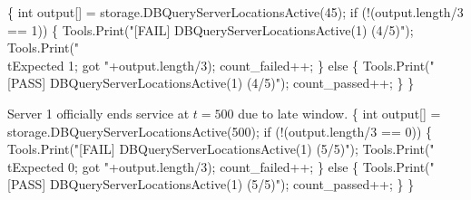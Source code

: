 \documentclass{article}
\def\nwendcode{\endtrivlist \endgroup}
\let\nwdocspar=\par
\begin{document}
\{
  int output[] = storage.DBQueryServerLocationsActive(45);
  if (!(output.length/3 == 1)) \{
    Tools.Print("[FAIL] DBQueryServerLocationsActive(1) (4/5)");
    Tools.Print("\\tExpected 1; got "+output.length/3);
    count_failed++;
  \} else \{
    Tools.Print("[PASS] DBQueryServerLocationsActive(1) (4/5)");
    count_passed++;
  \}
\}
\nwendcode{}\nwdocspar
Server 1 officially ends service at $t=500$ due to late window.
\nwenddocs{}\endmoddef{}
\{
  int output[] = storage.DBQueryServerLocationsActive(500);
  if (!(output.length/3 == 0)) \{
    Tools.Print("[FAIL] DBQueryServerLocationsActive(1) (5/5)");
    Tools.Print("\\tExpected 0; got "+output.length/3);
    count_failed++;
  \} else \{
    Tools.Print("[PASS] DBQueryServerLocationsActive(1) (5/5)");
    count_passed++;
  \}
\}
\nwendcode{}\nwdocspar
\end{document}
